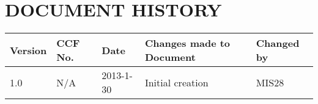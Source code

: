 \documentclass{project}
\begin{document}
\section*{DOCUMENT HISTORY}
\begin{tabular}{|l | l | l | l | l |}
\hline
Version & CCF No. & Date & Changes made to Document & Changed by \\
\hline
1.0 & N/A & 2013-1-30 & Initial creation & MIS28 \\
\hline
\end{tabular}
\label{thelastpage}
\end{document}
